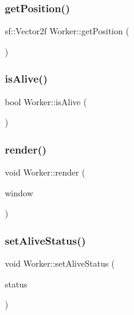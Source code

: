 \subsubsection{\texorpdfstring{getPosition()}{getPosition()}}
{\footnotesize\ttfamily sf\+::\+Vector2f Worker\+::get\+Position (\begin{DoxyParamCaption}{ }\end{DoxyParamCaption})}

\mbox{\label{class_worker_a20d86800eb99f234e606c324a25ca851}} 
\subsubsection{\texorpdfstring{isAlive()}{isAlive()}}
{\footnotesize\ttfamily bool Worker\+::is\+Alive (\begin{DoxyParamCaption}{ }\end{DoxyParamCaption})}

\mbox{\label{class_worker_a18940af5e921feefc2373e120d66ff24}} 
\subsubsection{\texorpdfstring{render()}{render()}}
{\footnotesize\ttfamily void Worker\+::render (\begin{DoxyParamCaption}\item[{sf\+::\+Render\+Window \&}]{window }\end{DoxyParamCaption})}

\mbox{\label{class_worker_a42c38d070074e01ccb554a064bc34212}} 
\subsubsection{\texorpdfstring{setAliveStatus()}{setAliveStatus()}}
{\footnotesize\ttfamily void Worker\+::set\+Alive\+Status (\begin{DoxyParamCaption}\item[{bool}]{status }\end{DoxyParamCaption})}

\mbox{\label{class_worker_aa02e1b87f60d58d1983c1374e0e02785}} 
